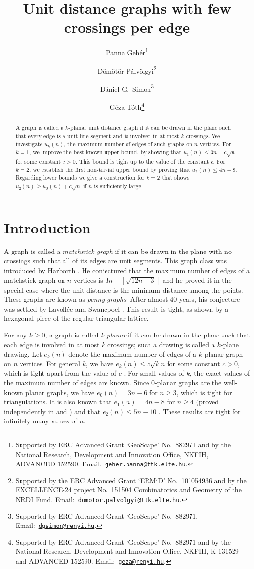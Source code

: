 \documentclass[10pt]{article}
\title{Unit distance graphs with few crossings per edge}
\author[1, 2]{Panna Geh\'er\thanks{Supported by ERC Advanced Grant `GeoScape' No.\ 882971 and by the National Research, Development and Innovation Office, NKFIH, ADVANCED 152590.  Email:~\href{mailto:geher.panna@ttk.elte.hu}{\tt geher.panna@ttk.elte.hu}.}}
\author[1, 2]{D\"{o}m\"{o}t\"{o}r P\'alvölgyi\thanks{Supported by the ERC Advanced Grant `ERMiD' No.\ 101054936 and by
the EXCELLENCE-24 project No.\ 151504 Combinatorics and Geometry of the NRDI Fund. Email:~\href{mailto:domotor.palvolgyi@ttk.elte.hu}{\tt domotor.palvolgyi@ttk.elte.hu}.}}
\author[1, 2]{D\'aniel G.\ Simon\thanks{Supported by ERC Advanced Grant `GeoScape' No.\ 882971. Email:~\href{mailto:dgsimon@renyi.hu}{\tt dgsimon@renyi.hu}.}}
\author[2, 3]{G\'eza T\'oth\thanks{Supported by ERC Advanced Grant `GeoScape' No.\ 882971 and by the National Research, Development and Innovation Office, NKFIH, K-131529 and ADVANCED 152590. Email:~\href{mailto:geza@renyi.hu}{\tt geza@renyi.hu}.}}
\affil[1]{
 ELTE E\"otv\"os Lor\'and University, Budapest, Hungary.
 }
\affil[2]{
HUN-REN Alfr\'ed R\'enyi Institute of Mathematics, Budapest, Hungary.
}
\affil[3]{
Department of Computer Science and Information Theory, Budapest University of Technology and Economics, Hungary.
}
\theoremstyle{definition}
\begin{document}
\maketitle

\begin{abstract}
A graph is called a $k$-planar unit distance graph if it can be drawn in the plane such that every edge is a unit line segment and is involved in at most $k$ crossings. We investigate $u_k(n)$, the maximum number of edges of such graphs on $n$ vertices. For $k=1$, we improve the best known upper bound, by showing that $u_1(n) \leq 3n - c\sqrt{n}$ for some constant $c>0$. This bound is tight up to the value of the constant $c$. For $k=2$, we establish the first non-trivial upper bound by proving that $u_2(n) \leq 4n - 8$. Regarding lower bounds we give a construction for $k=2$ that shows $u_2(n) \geq u_0(n) + c\sqrt{n}$ if $n$ is sufficiently large.
\end{abstract}


\section{Introduction}

A graph is called a \emph{matchstick graph} if it can be drawn in the plane with no crossings such that all of its edges are unit segments. This graph class was introduced by Harborth \cite{H81, H94}. He conjectured that the maximum number of edges of a matchstick graph on $n$ vertices is 
$3n - \left\lfloor\sqrt{12n - 3}\right\rfloor$ and he proved it \cite{H74} 
in the special case where the unit distance is the minimum distance among the points.
These graphs are known as \emph{penny graphs}. 
After almost 40 years, his conjecture was settled by Lavoll\'ee and Swanepoel \cite{LS22}. This result is tight, as shown by a hexagonal piece of the regular triangular lattice.

For any $k\ge 0$, a graph is called \emph{$k$-planar} if it can be drawn in the plane such that each edge is invol\-ved in at most $k$ crossings; such a drawing is called a $k$-plane drawing. Let $e_k(n)$ denote the maximum number of edges of a $k$-planar graph on $n$ vertices. For general $k$, we have $e_k(n)\le c\sqrt{k}n$ for some constant $c>0$, which is tight apart from the value of $c$ \cite{PT97, A19}. 
For small values of $k$, the exact values of the maximum number of edges are known. Since $0$-planar graphs are the well-known planar graphs, we have $e_0(n)=3n-6$ for $n\ge 3$, which is tight for triangulations. It is also known that $e_1(n)=4n-8$ for $n\ge 4$ (proved independently in \cite{BSW83} and \cite{PT97}) and that $e_2(n)\le 5n-10$ \cite{PT97}. These results are tight for infinitely many values of $n$.
\end{document}

